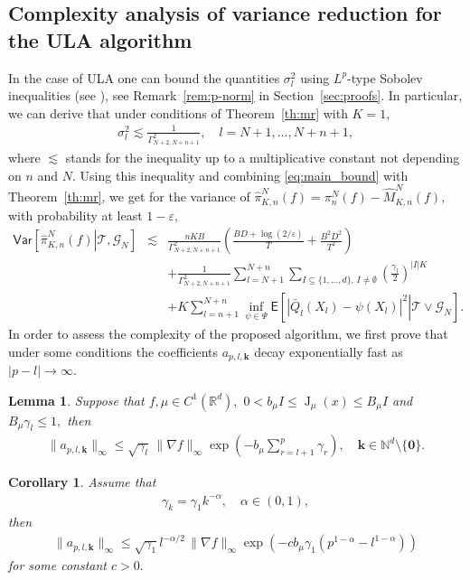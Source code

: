 \documentclass[preprint]{imsart}
\def\NtrainPath{T}
\def\TrainSet{\mathcal{T}}
\newtheorem{lem}[thm]{Lemma}
\newtheorem{cor}{Corollary}
\newcommand{\jac}[1]{\operatorname{J} _{#1}}
\begin{document}
\subsection{Complexity analysis of variance reduction for the ULA algorithm}
In the case of ULA one can bound the quantities \(\sigma_l^2\) using  \(L^p\)-type Sobolev inequalities  (see \cite{Adamczak}), see Remark~\ref{rem:p-norm} in Section~\ref{sec:proofs}. 
In particular, we can derive that  under conditions of Theorem~\ref{th:mr} with \(K=1,\)
\begin{eqnarray*}
\sigma_l^2\lesssim \frac{1}{\Gamma^2_{N+2,N+n+1}},\quad l=N+1,\ldots,N+n+1,
\end{eqnarray*}
where \(\lesssim \) stands for the inequality up to a multiplicative constant not depending on \(n\) and \(N.\) Using this inequality and combining \eqref{eq:main_bound} with Theorem~\ref{th:mr}, we get for the variance of \(\widehat \pi_{K,n}^N(f)=\pi_n^N(f)-\widehat M_{K,n}^N(f),\) with probability at least \(1-\varepsilon,\)
\begin{eqnarray}
\nonumber
\mathsf{Var}\left[\left.\widehat \pi_{K,n}^N(f)\right | \TrainSet, \mathcal{G}_N\right]&\lesssim & \frac{n KB}{\Gamma^2_{N+2,N+n+1}}
\left(\frac{BD+\log(2/\varepsilon)}{\NtrainPath}+\frac{B^2D^2}{\NtrainPath^2}\right)
\\
\nonumber
&& + \frac{1}{\Gamma^2_{N+2,N+n+1}}\sum_{l=N+1}^{N+n}\sum_{I\subseteq\{1,\ldots,d\},\, I\neq \emptyset}
\left(\frac{\gamma_{l}}{2}\right)^{|I|K}
\\
\label{eq:ula_red_var}
&& +
K \sum_{l=n+1}^{N+n}\inf_{\psi\in \Psi}
\mathsf{E}\left[\left.\left|\bar Q_l(X_{l})-\psi(X_{l})\right|^{2}\right | \TrainSet \vee \mathcal{G}_N \right].
\end{eqnarray}
In order to assess the complexity of the proposed algorithm,  we first prove that under some conditions the coefficients \(a_{p,l,\mathbf{k}}\) decay exponentially fast as \(|p-l|\to \infty.\)
\begin{lem}
\label{a_decay}
Suppose that \(f,\mu\in C^1(\mathbb{R}^d),\) \(0<b_\mu I\leq\jac{\mu}(x)\leq B_\mu I\) and \(B_\mu\gamma_{l}\leq 1,\) then
\begin{eqnarray*}
\|a_{p,l,\mathbf{k}}\|_{\infty}\leq \sqrt{\gamma_l}\, \|\nabla f\|_\infty\exp\left(-b_{\mu}\sum_{r=l+1}^p \gamma_{r}  \right),\quad \mathbf{k}\in \mathbb{N}^d\setminus \{\mathbf{0}\}.
\end{eqnarray*}
\end{lem}
\begin{cor}
Assume that 
\begin{eqnarray}
\label{eq:gamk-decay}
\gamma_k=\gamma_1 k^{-\alpha},\quad \alpha\in (0,1),
\end{eqnarray}
 then
\begin{eqnarray*}
\|a_{p,l,\mathbf{k}}\|_{\infty}\leq \sqrt{\gamma_1} l^{-\alpha/2}\, \|\nabla f\|_\infty\exp\left(-c b_{\mu}\gamma_1 (p^{1-\alpha}-l^{1-\alpha}) \right)
\end{eqnarray*}
for some constant \(c>0.\)
\end{cor}
\end{document}
